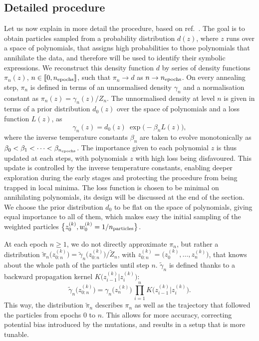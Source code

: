 \documentclass[11pt,a4paper]{article}
\begin{document}
	\subsection{Detailed procedure}	
	Let us now explain in more detail the procedure, based on ref.~\cite{del2006sequential,DoucetTutorial,naesseth2024elementssequentialmontecarlo}. 
	The goal is to obtain particles sampled from a probability distribution $d(z)$, where $z$ runs over a space of polynomials, that assigns high probabilities to those polynomials that annihilate the data, and therefore will be used to identify their symbolic expressions. We reconstruct this density function $d$ by series of density functions $\pi_n(z)$, $n\in\llbracket0,n_{\rm epochs}\rrbracket$, such that $\pi_n\to d$ as $n\to n_{\rm epochs}$. On every annealing step, $\pi_n$ is defined in terms of an unnormalised density $\gamma_n$ and a normalisation constant as $\pi_n(z) = \gamma_n(z)/Z_n$. The unnormalised density at level $n$ is given in terms of a prior distribution $d_0(z)$ over the space of polynomials and a loss function $L(z)$, as
		\begin{equation}\label{eq:gamman}
			\gamma_n(z) = d_0(z) \: \exp \Big( -\beta_n L(z)\Big),
		\end{equation}
	where the inverse temperature constants $\beta_n$ are taken to evolve monotonically as $\beta_0 < \beta_1 <\dots< \beta_{n_{\rm epochs}}$. The importance given to each polynomial $z$ is thus updated at each steps, with polynomials $z$ with high loss being disfavoured. This update is controlled by the inverse temperature constants, enabling deeper exploration during the early stages and protecting the procedure from being trapped in local minima. The loss function is chosen to be minimal on annihilating polynomials, its design will be discussed at the end of the section. We choose the prior distribution $d_{0}$ to be flat on the space of polynomials, giving equal importance to all of them, which makes easy the initial sampling of the weighted particles $\big\{z^{(k)}_{0},w^{(k)}_{0} = 1/n_{\rm particles}\big\}$.

	At each epoch $n\geq1$, we do not directly approximate $\pi_{n}$, but rather a distribution $\tilde{\pi}_{n}\big(z_{0:n}^{(k)}\big) = \tilde{\gamma}_{n}\big(z_{0:n}^{(k)}\big)/\tilde{Z}_{n}$, with $z_{0:n}^{(k)} = \big(z_{0}^{(k)},\ldots,z_{n}^{(k)}\big)$, that knows about the whole path of the particles until step $n$. $\tilde{\gamma}_{n}$ is defined thanks to a backward propagation kernel $K\big(z^{(k)}_{i-1}\vert z^{(k)}_{i}\big)$:
	\begin{equation}
		\tilde{\gamma}_{n}\big(z_{0:n}^{(k)}\big) = \gamma_{n}\big(z_{n}^{(k)}\big)\,\prod_{i=1}^{n} K\big(z^{(k)}_{i-1}\vert z^{(k)}_{i}\big).
	\end{equation}
	This way, the distribution $\tilde{\pi}_{n}$ describes $\pi_{n}$ as well as the trajectory that followed the particles from epochs $0$ to $n$. This allows for more accuracy, correcting potential bias introduced by the mutations, and results in a setup that is more tunable.
	
\end{document}
